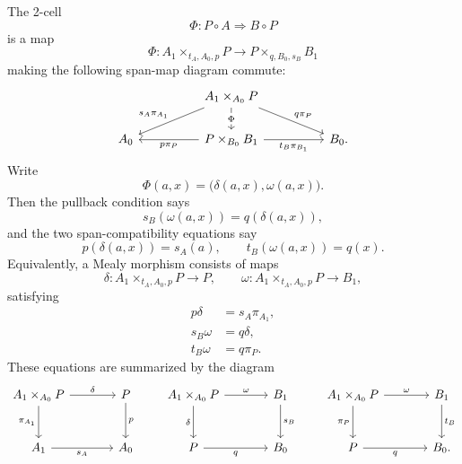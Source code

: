 The 2-cell
\[
    \Phi:P\circ A\Rightarrow B\circ P
\]
is a map
\[
    \Phi:
    A_1\times_{t_A,A_0,p}P
    \longrightarrow
    P\times_{q,B_0,s_B}B_1
\]
making the following span-map diagram commute:
\[
    \begin{tikzcd}[column sep=huge]  
        &
            A_1\times_{A_0}P
                \arrow[dl, "s_A\pi_{A_1}"']
                \arrow[dr, "q\pi_P"]
                \arrow[d, "\Phi" description]
        &  
        \\
            A_0
        &
            P\times_{B_0}B_1
                \arrow[l, "p\pi_P"]
                \arrow[r, "t_B\pi_{B_1}"']
        &
            B_0.
    \end{tikzcd}
\]
Write
\[
    \Phi(a,x)=\bigl(\delta(a,x),\omega(a,x)\bigr).
\]
Then the pullback condition says
\[
    s_B(\omega(a,x))=q(\delta(a,x)),
\]
and the two span-compatibility equations say
\[
    p(\delta(a,x))=s_A(a),
    \qquad
    t_B(\omega(a,x))=q(x).
\]
Equivalently, a Mealy morphism consists of maps
\[
    \delta:
    A_1\times_{t_A,A_0,p}P\to P,
    \qquad
    \omega:
    A_1\times_{t_A,A_0,p}P\to B_1,
\]
satisfying
\begin{align}
    p\delta&=s_A\pi_{A_1},
    \label{eq:mealy-definition-pdelta}
    \\
    s_B\omega&=q\delta,
    \label{eq:mealy-definition-source}
    \\
    t_B\omega&=q\pi_P.
    \label{eq:mealy-definition-target}
\end{align}
These equations are summarized by the diagram
\[
\begin{gathered}
\begin{tikzcd}[column sep=large, row sep=large]
        A_1\times_{A_0}P
            \arrow[r, "\delta"]
            \arrow[d, "\pi_{A_1}"']
    &
        P
            \arrow[d, "p"]
    \\
        A_1
            \arrow[r, "s_A"']
    &
        A_0
\end{tikzcd}
\qquad
\begin{tikzcd}[column sep=large, row sep=large]
        A_1\times_{A_0}P
            \arrow[r, "\omega"]
            \arrow[d, "\delta"']
    &
        B_1
            \arrow[d, "s_B"]
    \\
        P
            \arrow[r, "q"']
    &
        B_0
\end{tikzcd}
\qquad
\begin{tikzcd}[column sep=large, row sep=large]
        A_1\times_{A_0}P
            \arrow[r, "\omega"]
            \arrow[d, "\pi_P"']
    &
        B_1
            \arrow[d, "t_B"]
    \\
        P
            \arrow[r, "q"']
    &
        B_0.
\end{tikzcd}
\end{gathered}
\]
